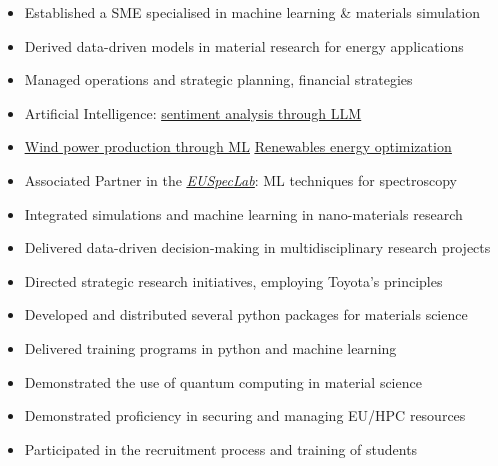 \documentclass[10pt,a4paper,ragged2e,withhyper]{altacv}
\begin{document}
\begin{paracol}{2}



\begin{itemize}
\item Established a SME specialised in machine learning \& materials simulation
\item Derived data-driven models in material research for energy applications
\item Managed operations and strategic planning, financial strategies
\item Artificial Intelligence: \href{https://github.com/marcodigennaro/LLM}{\underline{sentiment analysis through LLM}}
\item[] \href{https://github.com/marcodigennaro/windml}{\underline{Wind power production through ML}} 
\href{https://github.com/marcodigennaro/optimization}{\underline{Renewables energy optimization}} 
\item Associated Partner in the  \href{https://euspeclab.cnrs.fr/}{\underline{\emph{EUSpecLab}}}: ML techniques for  spectroscopy
\end{itemize}
\divider

\begin{itemize}
\item Integrated simulations and machine learning in nano-materials research
\item Delivered data-driven decision-making in multidisciplinary research projects
\item Directed strategic research initiatives, employing Toyota’s principles 
\item Developed and distributed  several python packages for materials science
\item Delivered training programs in python and machine learning
\item Demonstrated the use of quantum computing in material science
\item Demonstrated proficiency in securing and managing EU/HPC resources
\item Participated in the recruitment process and training of students
\end{itemize}
\divider


\end{paracol}
\end{document}
